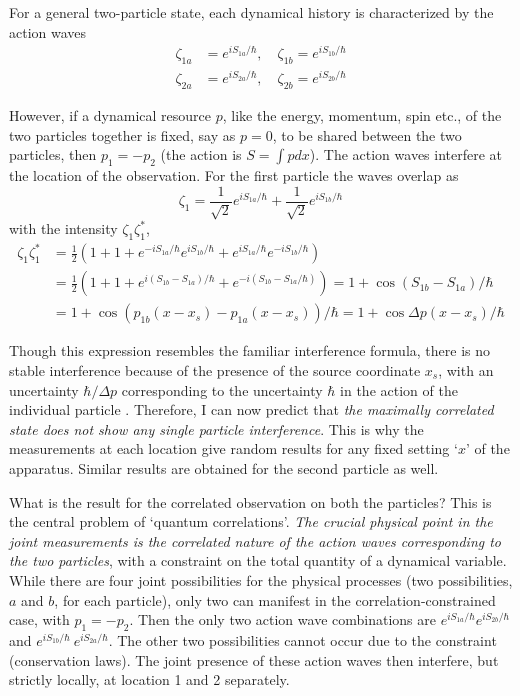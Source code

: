 For a general two-particle state, each dynamical history is characterized by the action waves
\begin{align*}
\zeta_{1a} & = e^{iS_{1a}/\hbar}, \quad \zeta_{1b}  = e^{iS_{1b}/\hbar} \nonumber\\
\zeta_{2a} & = e^{iS_{2a} /\hbar}, \quad \zeta_{2b} = e^{iS_{2b}/\hbar} \tag{33}\label{c14-eq33}
\end{align*}

However, if a dynamical resource $p$, like the energy, momentum, spin etc., of the two particles
together is fixed, say as $p = 0$, to be shared between the two particles, then $p_1 = - p_2$ (the
action is $S = \int pdx$). The action waves interfere at the location of the observation. 
For the first particle the waves overlap as
\begin{equation*}
\zeta_1 = \frac{1}{\sqrt{2}} e^{iS_{1a}/ \hbar}  + \frac{1}{\sqrt{2}} e^{iS_{1b} /\hbar} \tag{34}\label{c14-eq34}
\end{equation*}
with the intensity $\zeta_1 \zeta_1^{\ast}$,
{\fontsize{9}{9}\selectfont\begin{align*}
\zeta_1 \zeta^{\ast}_1 & = \frac{1}{2} \left(1+1+e^{-iS_{1a}/ \hbar} e^{iS_{1b} / \hbar} + e^{iS_{1a} / \hbar} e^{-iS_{1b}/\hbar} \right)\\
& = \frac{1}{2} \left( 1+1+e^{i(S_{1b} - S_{1a})/\hbar} + e^{-i(S_{1b} - S_{1a}/\hbar)} \right) = 1 + \cos (S_{1b} - S_{1a})/\hbar \tag{35}\label{c14-eq35}\\
& = 1 + \cos (p_{1b} (x-x_s) - p_{1a} (x-x_s)) / \hbar = 1 + \cos \Delta p (x-x_s) /\hbar \tag{36}\label{c14-eq36}
\end{align*}}
\newpage

Though this expression resembles the familiar interference formula, there is no stable interference because of the presence of the source coordinate $x_s$, with an uncertainty $\hbar/ \Delta p$ corresponding to the uncertainty $\hbar$ in the action of the individual particle \cite{chap14-key2}. Therefore, I can
now predict that \textit{the maximally correlated state does not show any single particle interference}. This is why the measurements at each location give random results for any fixed setting `$x$' of the apparatus. Similar results are obtained for the second particle as well.

What is the result for the correlated observation on both the particles? This is the
central problem of `quantum correlations'. \textit{The crucial physical point in the joint measurements is the correlated nature of the action waves corresponding to the two particles}, with a constraint on the total quantity of a dynamical variable. While there are four joint possibilities for the physical processes (two possibilities, $a$ and $b$, for each particle), only two can manifest in the correlation-constrained case, with $p_1 = -p_2$. Then the only two action wave combinations
are $e^{iS_{1a} /\hbar}  e^{iS_{2b} /\hbar}$ and $e^{iS_{1b}/ \hbar} ~e^{iS_{2a}/\hbar}$. The other two possibilities cannot occur due to the
constraint (conservation laws). The joint presence of these action waves then interfere, but strictly locally, at location 1 and 2 separately.

